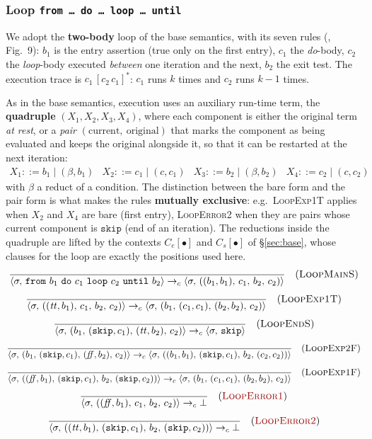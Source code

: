 \subsubsection{Loop \texttt{from\,\dots\,do\,\dots\,loop\,\dots\,until}}
\label{sec:loop}
We adopt the \textbf{two-body} loop of the base semantics, with its seven rules
(\cite{LamiLaneseStefani2024}, Fig.~9): $b_1$ is the entry assertion (true
only on the first entry), $c_1$ the \emph{do}-body, $c_2$ the \emph{loop}-body
executed \emph{between} one iteration and the next, $b_2$ the exit test. The
execution trace is $c_1\,[c_2\,c_1]^{*}$: $c_1$ runs $k$ times and $c_2$
runs $k-1$ times.

\medskip
\noindent
As in the base semantics, execution uses an auxiliary run-time term, the
\textbf{quadruple} $(X_1, X_2, X_3, X_4)$, where each component is either the
original term \emph{at rest}, or a \emph{pair}
$(\text{current},\allowbreak\ \text{original})$ that marks the component as being evaluated and
keeps the original alongside it, so that it can be restarted at the next iteration:
\[
\begin{array}{llll}
X_1 ::= b_1 \mid (\beta, b_1) &
X_2 ::= c_1 \mid (c, c_1) &
X_3 ::= b_2 \mid (\beta, b_2) &
X_4 ::= c_2 \mid (c, c_2)
\end{array}
\]
with $\beta$ a reduct of a condition. The distinction between the bare form and the pair
form is what makes the rules \textbf{mutually exclusive}: e.g.\
\textsc{LoopExp1T} applies when $X_2$ and $X_4$ are bare (first entry),
\textcolor{red!60!black}{\textsc{LoopError2}} when they are pairs whose current component is
$\mathtt{skip}$ (end of an iteration). The reductions inside the quadruple
are lifted by the contexts $C_e[\bullet]$ and $C_s[\bullet]$ of
\S\ref{sec:base}, whose clauses for the loop are exactly the positions
used here.
\[
\dfrac{}{\cfg{\mathtt{from}\ b_1\ \mathtt{do}\ c_1\ \mathtt{loop}\ c_2\ \mathtt{until}\ b_2}{\sigma}
       \toc \cfg{((b_1,b_1),\, c_1,\, b_2,\, c_2)}{\sigma}} \rname{LoopMainS}
\]
\[
\dfrac{}{\langle \sigma,\, ((\mathit{tt},b_1),\, c_1,\, b_2,\, c_2) \rangle
       \to_c \langle \sigma,\, (b_1,\, (c_1,c_1),\, (b_2,b_2),\, c_2) \rangle} \quad(\textsc{LoopExp1T})
\]
\[
\dfrac{}{\langle \sigma,\, (b_1,\, (\mathtt{skip},c_1),\, (\mathit{tt},b_2),\, c_2) \rangle
       \to_c \langle \sigma,\, \mathtt{skip} \rangle} \quad(\textsc{LoopEndS})
\]
{\small
\[
\dfrac{}{\langle \sigma,\, (b_1,\, (\mathtt{skip},c_1),\, (\mathit{ff},b_2),\, c_2) \rangle
       \to_c \langle \sigma,\, ((b_1,b_1),\, (\mathtt{skip},c_1),\, b_2,\, (c_2,c_2)) \rangle} \quad(\textsc{LoopExp2F})
\]}
{\small
\[
\dfrac{}{\langle \sigma,\, ((\mathit{ff},b_1),\, (\mathtt{skip},c_1),\, b_2,\, (\mathtt{skip},c_2)) \rangle
       \to_c \langle \sigma,\, (b_1,\, (c_1,c_1),\, (b_2,b_2),\, c_2) \rangle} \quad(\textsc{LoopExp1F})
\]}
\[
\dfrac{}{\cfg{((\ff,b_1),\, c_1,\, b_2,\, c_2)}{\sigma} \toc \bot} \rnameerr{LoopError1}
\]
\[
\dfrac{}{\cfg{((\ttt,b_1),\, (\mathtt{skip},c_1),\, b_2,\, (\mathtt{skip},c_2))}{\sigma}
       \toc \bot} \rnameerr{LoopError2}
\]

